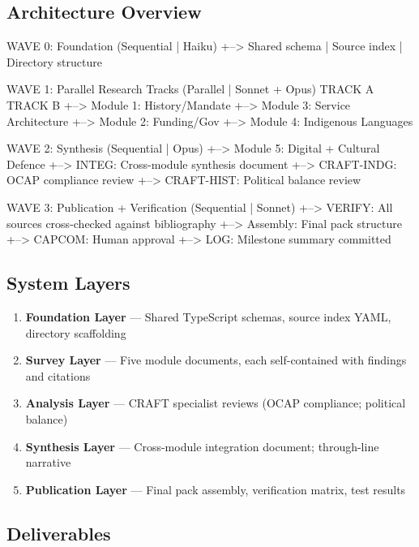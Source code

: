 \documentclass[11pt,letterpaper]{article}
\begin{document}
\subsection{Architecture Overview}

\begin{asciibox}
WAVE 0: Foundation (Sequential | Haiku)
  +--> Shared schema | Source index | Directory structure

WAVE 1: Parallel Research Tracks (Parallel | Sonnet + Opus)
  TRACK A                       TRACK B
  +--> Module 1: History/Mandate +--> Module 3: Service Architecture
  +--> Module 2: Funding/Gov     +--> Module 4: Indigenous Languages

WAVE 2: Synthesis (Sequential | Opus)
  +--> Module 5: Digital + Cultural Defence
  +--> INTEG: Cross-module synthesis document
  +--> CRAFT-INDG: OCAP compliance review
  +--> CRAFT-HIST: Political balance review

WAVE 3: Publication + Verification (Sequential | Sonnet)
  +--> VERIFY: All sources cross-checked against bibliography
  +--> Assembly: Final pack structure
  +--> CAPCOM: Human approval
  +--> LOG: Milestone summary committed
\end{asciibox}

\subsection{System Layers}

\begin{enumerate}[noitemsep]
\item \textbf{Foundation Layer} --- Shared TypeScript schemas, source index YAML, directory scaffolding
\item \textbf{Survey Layer} --- Five module documents, each self-contained with findings and citations
\item \textbf{Analysis Layer} --- CRAFT specialist reviews (OCAP compliance; political balance)
\item \textbf{Synthesis Layer} --- Cross-module integration document; through-line narrative
\item \textbf{Publication Layer} --- Final pack assembly, verification matrix, test results
\end{enumerate}

\subsection{Deliverables}
\end{document}
